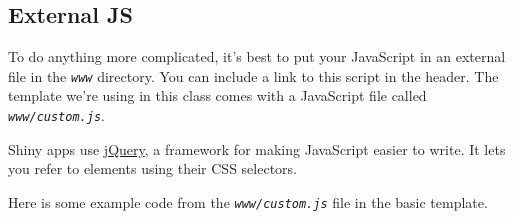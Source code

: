 \documentclass[
  oneside]{book}
\newenvironment{Shaded}{\begin{snugshade}}{\end{snugshade}}
\newcommand{\AttributeTok}[1]{\textcolor[rgb]{0.77,0.63,0.00}{#1}}
\newcommand{\BuiltInTok}[1]{#1}
\newcommand{\CommentTok}[1]{\textcolor[rgb]{0.56,0.35,0.01}{\textit{#1}}}
\newcommand{\FunctionTok}[1]{\textcolor[rgb]{0.00,0.00,0.00}{#1}}
\newcommand{\KeywordTok}[1]{\textcolor[rgb]{0.13,0.29,0.53}{\textbf{#1}}}
\newcommand{\NormalTok}[1]{#1}
\newcommand{\OperatorTok}[1]{\textcolor[rgb]{0.81,0.36,0.00}{\textbf{#1}}}
\newcommand{\SpecialCharTok}[1]{\textcolor[rgb]{0.00,0.00,0.00}{#1}}
\newcommand{\StringTok}[1]{\textcolor[rgb]{0.31,0.60,0.02}{#1}}
\begin{document}
\hypertarget{external-js}{%
\subsection{External JS}\label{external-js}}

To do anything more complicated, it's best to put your JavaScript in an external file in the \textit{\texttt{www}} directory. You can include a link to this script in the header. The template we're using in this class comes with a JavaScript file called \textit{\texttt{www/custom.js}}.

\begin{Shaded}
\end{Shaded}

Shiny apps use \href{https://jquery.com/}{jQuery}, a framework for making JavaScript easier to write. It lets you refer to elements using their CSS selectors.

Here is some example code from the \textit{\texttt{www/custom.js}} file in the basic template.

\begin{Shaded}
\end{Shaded}
\end{document}
